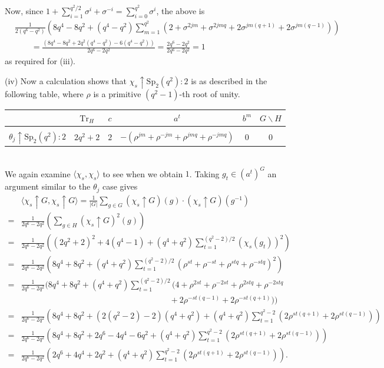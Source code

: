 \documentclass{amsart}
\begin{document}
Now, since $1+\sum_{i=1}^{q^2/2} \sigma^i+\sigma^{-i}=\sum_{i=0}^{q^2} \sigma^i$,  the above  is
\begin{align*}&
\frac{1}{2(q^6-q^2)}\left(8q^4-8q^2+(q^4-q^2)\sum_{m=1}^{q^2}\left(
2+\sigma^{2jm}+\sigma^{2jmq}+2\sigma^{jm(q+1)}+2\sigma^{jm(q-1)}
\right)\right)\\&\qquad = 
\frac{(8q^4-8q^2+2q^2(q^4-q^2)-6(q^4-q^2))}{2q^6-2q^2} = \frac{2q^6-2q^2}{2q^6-2q^2} = 1
\end{align*}
as required for (iii). 
\medskip


\noindent (iv) 
Now a calculation shows that $\chi_s \uparrow \mathrm{Sp}_2(q^2)\colon 2$ 
is as  described in the following  table, where $\rho$ is a primitive $(q^2-1)$-th root of unity. 
\\[5mm]
\begin{tabular}{c|ccccc}
 & $\text{Tr}_H$ & $c$ & $a^t$ & $b^m$ & $G \smallsetminus H$\\
\hline\\
$\theta_j \uparrow \mathrm{Sp}_2(q^2)\colon 2$ & $2q^2+2$ & $2$ &  $-(\rho^{jm} + \rho^{-jm}+\rho^{jmq} + \rho^{-jmq})$ &$0$  & $0$
\end{tabular}
\\[5mm]
We again examine $\langle \chi_s,\chi_s\rangle$ to see when we obtain $1$.
 Taking $g_t\in (a^t)^G$ an argument similar to the $\theta_j$ case gives   
 \begin{align*}
 &\langle \chi_s\uparrow G, \chi_s  \uparrow G\rangle
 =\frac{1}{|G|} \sum_{g\in G} \left(\chi_s\uparrow G\right)(g)\cdot\left(\chi_s\uparrow G\right)\left(g^{-1}\right)\\
 =&\frac{1}{2q^6-2q^2}\left(\sum_{g\in H} \left(\chi_s\uparrow G\right)^2(g)\right)\\
 =&\frac{1}{2q^6-2q^2}\left((2q^2+2)^2 + 4(q^4-1) + (q^4+q^2)\sum_{t=1}^{(q^2-2)/2}\left(\chi_s(g_t)\right)^2\right)\\
 =&\frac{1}{2q^6-2q^2}\left(8q^4+8q^2 + (q^4+q^2)\sum_{t=1}^{(q^2-2)/2}\left(\rho^{st} + \rho^{-st} + \rho^{stq} + \rho^{-stq}\right)^2\right)\\
 =&\frac{1}{2q^6-2q^2}\Bigg(8q^4+8q^2 + (q^4+q^2)\sum_{t=1}^{(q^2-2)/2}\Big(4+\rho^{2st} + \rho^{-2st} + \rho^{2stq} + \rho^{-2stq}\\
  &\qquad \qquad\qquad\qquad\qquad\qquad\qquad\qquad\qquad + 2\rho^{-st(q-1)} + 2\rho^{-st(q+1)}\Big)\Bigg)\\
 =& \frac{1}{2q^6-2q^2}\left(8q^4+8q^2 + \left(2(q^2-2)-2\right)(q^4+q^2) + (q^4+q^2)\sum_{t=1}^{q^2-2}(2\rho^{st(q+1)} + 2\rho^{st(q-1)})\right)\\
 =& \frac{1}{2q^6-2q^2}\left(8q^4+8q^2 + 2q^6-4q^4-6q^2 +  (q^4+q^2)\sum_{t=1}^{q^2-2}(2\rho^{st(q+1)} + 2\rho^{st(q-1)})\right)\\
 =& \frac{1}{2q^6-2q^2}\left(2q^6+4q^4+2q^2 +  (q^4+q^2)\sum_{t=1}^{q^2-2}(2\rho^{st(q+1)} + 2\rho^{st(q-1)})\right).
 \end{align*}
\end{document}
